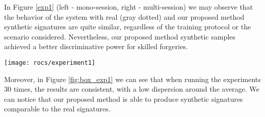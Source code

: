 In Figure \ref{exp1} (left - mono-session, right - multi-session) we
may observe that the behavior of the system with real (gray dotted) and our proposed method synthetic signatures are quite similar, regardless of
the training protocol or the scenario considered. Nevertheless, our proposed method synthetic samples achieved a better discriminative power for skilled forgeries.
\begin{figure*}[!htb]
    \centering
    \texttt{[image: rocs/experiment1]}
    \caption{DET curves for real offline signatures and synthetic signatures (from Diaz \textit{et al.} and our proposed method), for the first experiment (mono-session and multi-session enrollment), for the two scenarios considered (random and skilled impostors)}
    \label{exp1}
\end{figure*}

Moreover, in Figure \ref{fig:box_exp1} we can see that when running the experiments 30 times, the results are consistent, with a low dispersion around the average. We can notice that our proposed method is able to produce synthetic signatures comparable to the real signatures.


\begin{figure*}[!htb]
\centering
\hspace*{0.2in} %
\hspace*{0.3in} %
\hspace*{0.2in} %
\caption{Boxplot comparison for running 30 times the Experiment 1 - mono-session scenario and multi-session. (a) mono-session scenario, random forgeries, (b) mono-session scenario, skilled forgeries, (c) multi-session scenario, random forgeries, (d) multi-session scenario, skilled forgeries. } \label{fig:box_exp1}
\end{figure*}

